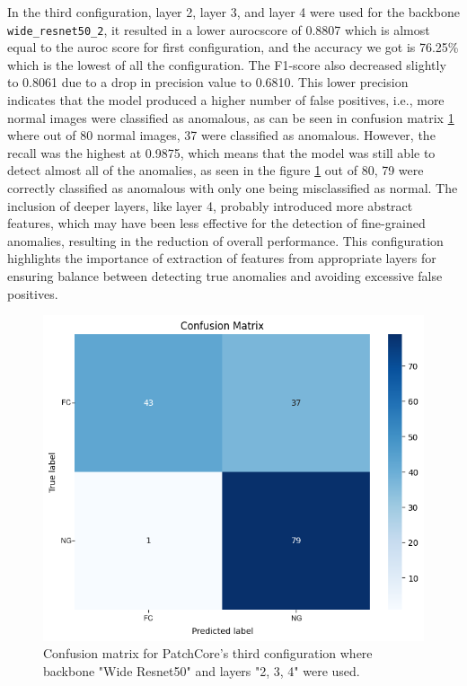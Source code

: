 In the third configuration, layer 2, layer 3, and layer 4 were used for the backbone \texttt{wide\_resnet50\_2}, it resulted in a lower \gls{auroc}score of 0.8807 which is almost equal to the \gls{auroc} score for first configuration, and the accuracy we got is 76.25\% which is the lowest of all the configuration. The F1-score also decreased slightly to 0.8061 due to a drop in precision value to 0.6810. This lower precision indicates that the model produced a higher number of false positives, i.e., more normal images were classified as anomalous, as can be seen in confusion matrix \ref{fig:patchcore config3 confusion matrix} where out of 80 normal images, 37 were classified as anomalous. However, the recall was the highest at 0.9875, which means that the model was still able to detect almost all of the anomalies, as seen in the figure \ref{fig:patchcore config3 confusion matrix} out of 80, 79 were correctly classified as anomalous with only one being misclassified as normal. The inclusion of deeper layers, like layer 4, probably introduced more abstract features, which may have been less effective for the detection of fine-grained anomalies, resulting in the reduction of overall performance. This configuration highlights the importance of extraction of features from appropriate layers for ensuring balance between detecting true anomalies and avoiding excessive false positives.

\begin{figure}[ht!]
    \centering
    \includegraphics[width=1\linewidth]{Rohit_Master_Thesis//Images/patchcore_config3_confusion_matrix.png}
    \caption{Confusion matrix for PatchCore's third configuration where backbone "Wide Resnet50" and layers "2, 3, 4" were used.}
    \label{fig:patchcore config3 confusion matrix}
\end{figure}

